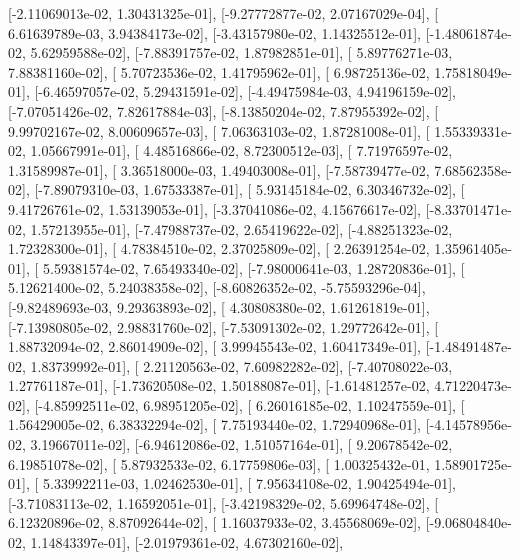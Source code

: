 \documentclass{article}
\begin{document}
       [-2.11069013e-02,  1.30431325e-01],
       [-9.27772877e-02,  2.07167029e-04],
       [ 6.61639789e-03,  3.94384173e-02],
       [-3.43157980e-02,  1.14325512e-01],
       [-1.48061874e-02,  5.62959588e-02],
       [-7.88391757e-02,  1.87982851e-01],
       [ 5.89776271e-03,  7.88381160e-02],
       [ 5.70723536e-02,  1.41795962e-01],
       [ 6.98725136e-02,  1.75818049e-01],
       [-6.46597057e-02,  5.29431591e-02],
       [-4.49475984e-03,  4.94196159e-02],
       [-7.07051426e-02,  7.82617884e-03],
       [-8.13850204e-02,  7.87955392e-02],
       [ 9.99702167e-02,  8.00609657e-03],
       [ 7.06363103e-02,  1.87281008e-01],
       [ 1.55339331e-02,  1.05667991e-01],
       [ 4.48516866e-02,  8.72300512e-03],
       [ 7.71976597e-02,  1.31589987e-01],
       [ 3.36518000e-03,  1.49403008e-01],
       [-7.58739477e-02,  7.68562358e-02],
       [-7.89079310e-03,  1.67533387e-01],
       [ 5.93145184e-02,  6.30346732e-02],
       [ 9.41726761e-02,  1.53139053e-01],
       [-3.37041086e-02,  4.15676617e-02],
       [-8.33701471e-02,  1.57213955e-01],
       [-7.47988737e-02,  2.65419622e-02],
       [-4.88251323e-02,  1.72328300e-01],
       [ 4.78384510e-02,  2.37025809e-02],
       [ 2.26391254e-02,  1.35961405e-01],
       [ 5.59381574e-02,  7.65493340e-02],
       [-7.98000641e-03,  1.28720836e-01],
       [ 5.12621400e-02,  5.24038358e-02],
       [-8.60826352e-02, -5.75593296e-04],
       [-9.82489693e-03,  9.29363893e-02],
       [ 4.30808380e-02,  1.61261819e-01],
       [-7.13980805e-02,  2.98831760e-02],
       [-7.53091302e-02,  1.29772642e-01],
       [ 1.88732094e-02,  2.86014909e-02],
       [ 3.99945543e-02,  1.60417349e-01],
       [-1.48491487e-02,  1.83739992e-01],
       [ 2.21120563e-02,  7.60982282e-02],
       [-7.40708022e-03,  1.27761187e-01],
       [-1.73620508e-02,  1.50188087e-01],
       [-1.61481257e-02,  4.71220473e-02],
       [-4.85992511e-02,  6.98951205e-02],
       [ 6.26016185e-02,  1.10247559e-01],
       [ 1.56429005e-02,  6.38332294e-02],
       [ 7.75193440e-02,  1.72940968e-01],
       [-4.14578956e-02,  3.19667011e-02],
       [-6.94612086e-02,  1.51057164e-01],
       [ 9.20678542e-02,  6.19851078e-02],
       [ 5.87932533e-02,  6.17759806e-03],
       [ 1.00325432e-01,  1.58901725e-01],
       [ 5.33992211e-03,  1.02462530e-01],
       [ 7.95634108e-02,  1.90425494e-01],
       [-3.71083113e-02,  1.16592051e-01],
       [-3.42198329e-02,  5.69964748e-02],
       [ 6.12320896e-02,  8.87092644e-02],
       [ 1.16037933e-02,  3.45568069e-02],
       [-9.06804840e-02,  1.14843397e-01],
       [-2.01979361e-02,  4.67302160e-02],
\end{document}
